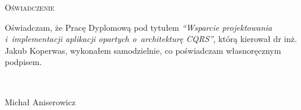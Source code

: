 \newpage
\thispagestyle{empty}


\begin{center}
 \LARGE\textsc{Oświadczenie}
\end{center}

\vspace{1cm}

Oświadczam, że Pracę Dyplomową pod tytułem \emph{``Wsparcie projektowania i~implementacji aplikacji opartych o~architekturę CQRS''}, którą kierował dr inż. Jakub Koperwas, wykonałem samodzielnie, co poświadczam własnoręcznym podpisem.

\vspace{2cm}

\begin{flushright}
\begin{minipage}{5cm}
 \dotfill \\[-0.7cm]
 \begin{center}
  \small Michał Aniserowicz
 \end{center}
\end{minipage}
\end{flushright}

